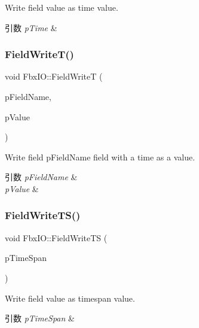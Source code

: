 Write field value as time value. 
\begin{DoxyParams}{引数}
{\em p\+Time} & \\
\hline
\end{DoxyParams}
\mbox{\label{class_fbx_i_o_a83e5aede6a13095e5c341245459a448e}} 
\subsubsection{\texorpdfstring{Field\+Write\+T()}{FieldWriteT()}\hspace{0.1cm}{\footnotesize\ttfamily [2/2]}}
{\footnotesize\ttfamily void Fbx\+I\+O\+::\+Field\+WriteT (\begin{DoxyParamCaption}\item[{const char $\ast$}]{p\+Field\+Name,  }\item[{\hyperlink{class_fbx_time}{Fbx\+Time}}]{p\+Value }\end{DoxyParamCaption})}

Write field p\+Field\+Name field with a time as a value. 
\begin{DoxyParams}{引数}
{\em p\+Field\+Name} & \\
\hline
{\em p\+Value} & \\
\hline
\end{DoxyParams}
\mbox{\label{class_fbx_i_o_ac87f59973fcbd09f3866ff9b08ea3fb0}} 
\subsubsection{\texorpdfstring{Field\+Write\+T\+S()}{FieldWriteTS()}\hspace{0.1cm}{\footnotesize\ttfamily [1/2]}}
{\footnotesize\ttfamily void Fbx\+I\+O\+::\+Field\+Write\+TS (\begin{DoxyParamCaption}\item[{\hyperlink{class_fbx_time_span}{Fbx\+Time\+Span}}]{p\+Time\+Span }\end{DoxyParamCaption})}

Write field value as timespan value. 
\begin{DoxyParams}{引数}
{\em p\+Time\+Span} & \\
\hline
\end{DoxyParams}
\mbox{\label{class_fbx_i_o_a3ba9e3898cefb758990509ccd76c254a}} 
